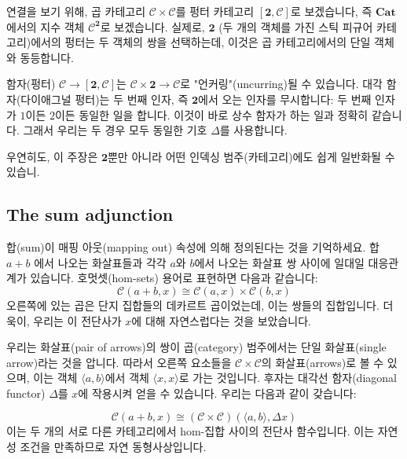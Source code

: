 \documentclass[DaoFP]{subfiles}
\begin{document}
연결을 보기 위해, 곱 카테고리 $\mathcal{C} \times \mathcal{C}$를 펑터 카테고리 $[ \mathbf{2}, \mathcal{C}]$로 보겠습니다, 즉 $\mathbf{Cat}$에서의 지수 객체 $\mathcal{C}^{ \mathbf{2}}$로 보겠습니다. 실제로, $\mathbf{2}$ (두 개의 객체를 가진 스틱 피규어 카테고리)에서의 펑터는 두 객체의 쌍을 선택하는데, 이것은 곱 카테고리에서의 단일 객체와 동등합니다.


함자(펑터) $\mathcal{C} \to [\mathbf{2}, \mathcal{C}]$는 $\mathcal{C} \times \mathbf{2} \to  \mathcal{C}$로 "언커링"(uncurring)될 수 있습니다. 대각 함자(다이애그널 펑터)는 두 번째 인자, 즉 $\mathbf{2}$에서 오는 인자를 무시합니다: 두 번째 인자가 $1$이든 $2$이든 동일한 일을 합니다. 이것이 바로 상수 함자가 하는 일과 정확히 같습니다. 그래서 우리는 두 경우 모두 동일한 기호 $\Delta$를 사용합니다.

우연히도, 이 주장은 $\mathbf{2}$뿐만 아니라 어떤 인덱싱 범주(카테고리)에도 쉽게 일반화될 수 있습니.

\subsection{The sum adjunction}

합(sum)이 매핑 아웃(mapping out) 속성에 의해 정의된다는 것을 기억하세요. 합 $a + b$ 에서 나오는 화살표들과 각각 $a$와 $b$에서 나오는 화살표 쌍 사이에 일대일 대응관계가 있습니다. 호멋셋(hom-sets) 용어로 표현하면 다음과 같습니다:
\[  \mathcal{C} (a + b, x) \cong \mathcal{C}( a , x) \times \mathcal{C}( b , x)\]
오른쪽에 있는 곱은 단지 집합들의 데카르트 곱이었는데, 이는 쌍들의 집합입니다. 더욱이, 우리는 이 전단사가 $x$에 대해 자연스럽다는 것을 보았습니다.

우리는 화살표(pair of arrows)의 쌍이 곱(category) 범주에서는 단일 화살표(single arrow)라는 것을 압니다. 따라서 오른쪽 요소들을 $\mathcal{C} \times \mathcal{C}$의 화살표(arrows)로 볼 수 있으며, 이는 객체 $\langle a, b \rangle$에서 객체 $\langle x, x \rangle$로 가는 것입니다. 후자는 대각선 함자(diagonal functor) $\Delta$를 $x$에 작용시켜 얻을 수 있습니다. 우리는 다음과 같이 갖습니다:

\[  \mathcal{C} (a + b, x) \cong (\mathcal{C} \times \mathcal{C})( \langle a, b \rangle , \Delta x)\]
이는 두 개의 서로 다른 카테고리에서 hom-집합 사이의 전단사 함수입니다. 이는 자연성 조건을 만족하므로 자연 동형사상입니다.
\end{document}
